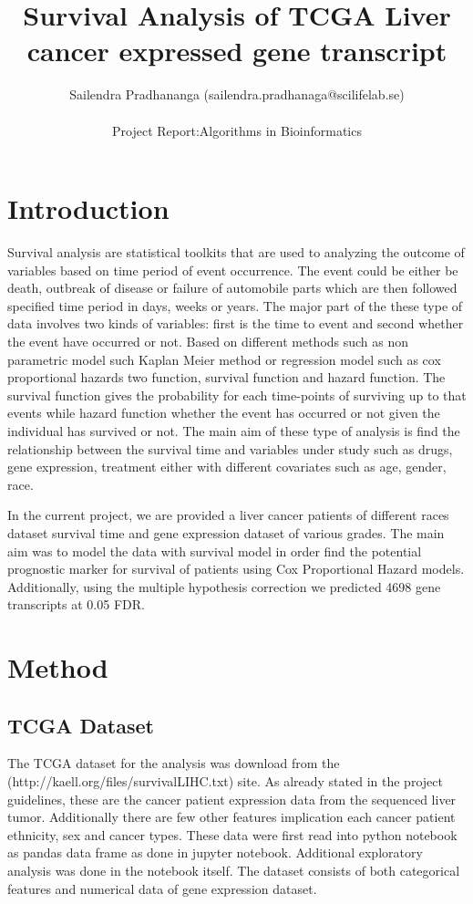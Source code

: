 \documentclass[a4paper,9pt]{article}
\title{Survival Analysis of TCGA Liver cancer expressed gene transcript }
\author{ Sailendra Pradhananga (sailendra.pradhanaga@scilifelab.se)\\ \\
			Project Report:Algorithms in Bioinformatics}
\begin{document}
\maketitle

\section{Introduction}


Survival analysis are statistical toolkits that are used to analyzing the outcome of variables based on time period of event occurrence. The event could be either be death, outbreak of disease or failure of automobile parts which are then followed specified time period in days, weeks or years. The major part of the these type of data involves two kinds of variables: first is the time to event and second whether the event have occurred or not. Based on different methods such as non parametric model such Kaplan Meier method or regression model such as cox proportional hazards two function, survival function and hazard function. The survival function gives the probability  for each time-points of surviving up to that events while hazard function whether the event has occurred or not  given the individual has survived or not. The main aim of these type of analysis is find the relationship between the survival time and variables under study such as drugs, gene expression, treatment  either with different covariates such as age, gender, race.

In the current project, we are provided a liver cancer patients of different races  dataset survival time and gene expression dataset of various grades. The main aim was to model the data with survival model in order find the potential prognostic marker for survival of patients using Cox Proportional Hazard models. Additionally, using the multiple hypothesis correction we predicted 4698 gene transcripts at 0.05 FDR. 

\section{Method}

	\subsection{TCGA Dataset}
The  TCGA dataset for the analysis was download from the (http://kaell.org/files/survivalLIHC.txt) site. As already stated in the project guidelines, these are the cancer patient expression data from the sequenced liver tumor.  Additionally there are few other features implication each cancer patient ethnicity, sex and cancer types.  These data were first read into python notebook as pandas data frame  as done in  jupyter notebook.  Additional exploratory analysis was done in the notebook itself. The  dataset consists of both categorical features and numerical data of gene expression dataset. 
\end{document}
